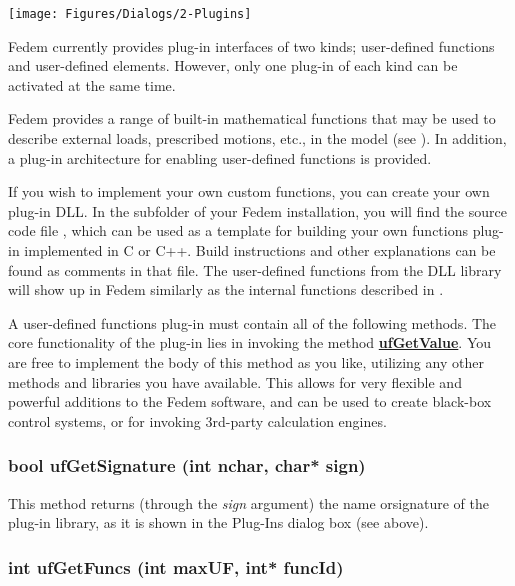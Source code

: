 \begin{center}
  \texttt{[image: Figures/Dialogs/2-Plugins]}
\end{center}

Fedem currently provides plug-in interfaces of two kinds; user-defined functions
and user-defined elements. However, only one plug-in of each kind can be
activated at the same time.



Fedem provides a range of built-in mathematical functions that may be
used to describe external loads, prescribed motions, etc., in the model
(see ).
In addition, a plug-in architecture for enabling user-defined functions
is provided.

If you wish to implement your own custom functions, you can create your
own plug-in DLL. In the  subfolder of your Fedem installation,
you will find the source code file , which can be used as
a template for building your own functions plug-in implemented in C or C++.
Build instructions and other explanations can be found as comments in that file.
The user-defined functions from the DLL library will show up in Fedem similarly
as the internal functions described in .

A user-defined functions plug-in must contain all of the following methods.
The core functionality of the plug-in lies in invoking the method
\protect\hyperlink{ufgetvalue}{\bf ufGetValue}.
You are free to implement the body of this method as you like,
utilizing any other methods and libraries you have available.
This allows for very flexible and powerful additions to the Fedem software,
and can be used to create black-box control systems, or for invoking 3rd-party
calculation engines.

\subsubsection{bool ufGetSignature (int nchar, char* sign)}

This method returns (through the {\sl sign} argument) the name orsignature
of the plug-in library, as it is shown in the Plug-Ins dialog box (see above).

\subsubsection{int ufGetFuncs (int maxUF, int* funcId)}


